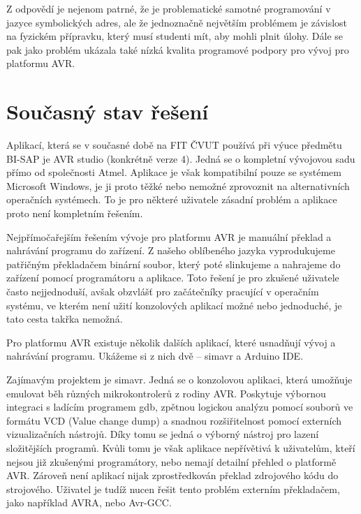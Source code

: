 Z odpovědí je nejenom patrné, že je problematické samotné programování v jazyce symbolických adres, ale že jednoznačně největším problémem je závislost na fyzickém přípravku, který musí studenti mít, aby mohli plnit úlohy. Dále se pak jako problém ukázala také nízká kvalita programové podpory pro vývoj pro platformu AVR.

\section{Současný stav řešení}

Aplikací, která se v současné době na FIT ČVUT používá při výuce předmětu BI-SAP je AVR studio (konkrétně verze 4)\cite{sap-avr-studio}. Jedná se o kompletní vývojovou sadu přímo od společnosti Atmel\footnotemark. Aplikace je však kompatibilní pouze se systémem Microsoft Windows\cite{avr-studio-requirements}, je ji proto těžké nebo nemožné zprovoznit na alternativních operačních systémech. To je pro některé uživatele zásadní problém a aplikace proto není kompletním řešením.


Nejpřímočařejším řešením vývoje pro platformu AVR je manuální překlad a nahrávání programu do zařízení. Z našeho oblíbeného jazyka vyprodukujeme patřičným překladačem binární soubor, který poté slinkujeme a nahrajeme do zařízení pomocí programátoru a aplikace. Toto řešení je pro zkušené uživatele často nejjednoduší, avšak obzvlášť pro začátečníky pracující v operačním systému, ve kterém není užití konzolových aplikací možné nebo jednoduché, je tato cesta takřka nemožná.

Pro platformu AVR existuje několik dalších aplikací, které usnadňují vývoj a nahrávání programu. Ukážeme si z nich dvě -- simavr\cite{github-simavr} a Arduino IDE\cite{arduino-ide}.


Zajímavým projektem je simavr\cite{github-simavr}. Jedná se o konzolovou aplikaci, která umožňuje emulovat běh různých mikrokontrolerů z rodiny AVR. Poskytuje výbornou integraci s ladícím programem gdb, zpětnou logickou analýzu pomocí souborů ve formátu VCD (Value change dump) a snadnou rozšiřitelnost pomocí externích vizualizačních nástrojů. Díky tomu se jedná o výborný nástroj pro lazení složitějších programů. Kvůli tomu je však aplikace nepřívětivá k uživatelům, kteří nejsou již zkušenými programátory, nebo nemají detailní přehled o platformě AVR. Zároveň není aplikací nijak zprostředkován překlad zdrojového kódu do strojového. Uživatel je tudíž nucen řešit tento problém externím překladačem, jako například AVRA\cite{avra-homepage}, nebo Avr-GCC\cite{avr-gcc}.

